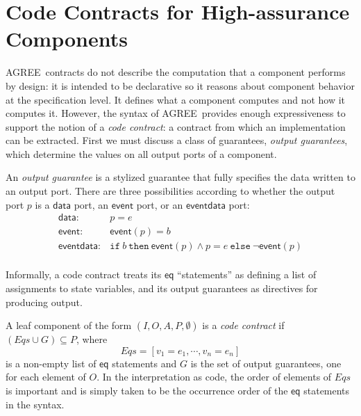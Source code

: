 \documentclass[global,twocolumn]{svjour}
\newcommand{\konst}[1]{\ensuremath{\mathsf{#1}}}
\newcommand{\itelse}[3]{\mbox{$\mathtt{if}\ {#1}\ \mathtt{then}\ {#2}\ \mathtt{else}\ {#3}$}}
\newcommand{\agr}{AGREE}
\begin{document}

\section{Code Contracts for High-assurance Components}
\label{sec:code-contracts}

\agr\ contracts do not describe the computation that a component performs by design:
%
it is intended to be declarative so it reasons about component behavior at the specification level.
%
It defines what a component computes and not how it computes it.
%
However, the syntax of \agr\ provides enough expressiveness to support the notion of a \emph{code contract}: a contract from which an implementation can be extracted.
%
First we must discuss a class of guarantees, \emph{output guarantees}, which determine the values on all output ports of a component.

\begin{definition}
An \emph{output guarantee} is a stylized guarantee that fully specifies the data written to an output port.
%
There are three possibilities according to whether the output port $p$ is a \konst{data} port, an \konst{event} port, or an \konst{event data} port:
%
\[
\begin{array}{ll}
\konst{data}: &  p = \mathit{e} \\
\konst{event}: &  \konst{event} (p) = \mathit{b} \\
\konst{event data}: & \itelse{b}{\konst{event} (p) \land p = e}{\neg \konst{event}(p)} \\
\end{array}
\]
%
\end{definition}

Informally, a code contract treats its \konst{eq} ``statements'' as defining a list of assignments to state variables, and its output guarantees as directives for producing output.

\begin{definition}
A leaf component of the form $(I,O,A,P,\emptyset)$ is a \emph{code contract} if $(\mathit{Eqs} \cup G) \subseteq P$, where \[\mathit{Eqs} = [v_1 = e_1, \cdots , v_n = e_n] \] is a non-empty list of \konst{eq} statements and $G$ is the set of output guarantees, one for each element of $O$.
%
In the interpretation as code, the order of elements of $\mathit{Eqs}$ is important and is simply taken to be the occurrence order of the \konst{eq} statements in the syntax.
\end{definition}
\end{document}
